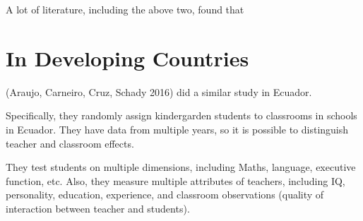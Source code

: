             A lot of literature, including the above two, found that 


    \section{In Developing Countries}

        \cite{araujo_teacher_2016} (Araujo, Carneiro, Cruz, Schady 2016) did a similar study in Ecuador.

        Specifically, they randomly assign kindergarden students to classrooms in schools in Ecuador. They have data from multiple years, so it is possible to distinguish teacher and classroom effects. 

        They test students on multiple dimensions, including Maths, language, executive function, etc. Also, they measure multiple attributes of teachers, including IQ, personality, education, experience, and classroom observations (quality of interaction between teacher and students).
        
